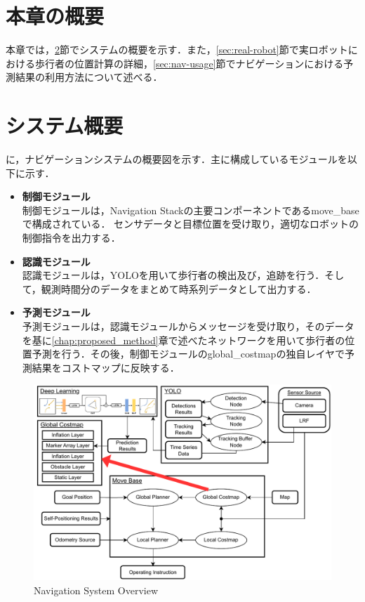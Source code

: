 
\vspace{-10pt}

\section{本章の概要}
本章では，\ref{sec:nav-sys}節でシステムの概要を示す．また，\ref{sec:real-robot}節で実ロボットにおける歩行者の位置計算の詳細，\ref{sec:nav-usage}節でナビゲーションにおける予測結果の利用方法について述べる．


\section{システム概要}\label{sec:nav-sys}
に，ナビゲーションシステムの概要図を示す．主に構成しているモジュールを以下に示す．

\begin{itemize}
  \item \textbf{制御モジュール} \\
  制御モジュールは，Navigation Stackの主要コンポーネントであるmove\_baseで構成されている．
  センサデータと目標位置を受け取り，適切なロボットの制御指令を出力する．
  \item \textbf{認識モジュール} \\
  認識モジュールは，YOLOを用いて歩行者の検出及び，追跡を行う．そして，観測時間分のデータをまとめて時系列データとして出力する．
  \item \textbf{予測モジュール} \\
  予測モジュールは，認識モジュールからメッセージを受け取り，そのデータを基に\ref{chap:proposed_method}章で述べたネットワークを用いて歩行者の位置予測を行う．その後，制御モジュールのglobal\_costmapの独自レイヤで予測結果をコストマップに反映する．
\end{itemize}

\newpage

\vspace*{15pt}

\begin{figure}[H]
  \centering
 \includegraphics[keepaspectratio, scale=0.77]
      {images/application_system.pdf}
 \caption{Navigation System Overview}
 \label{Fig:nav-system}
\end{figure}  

